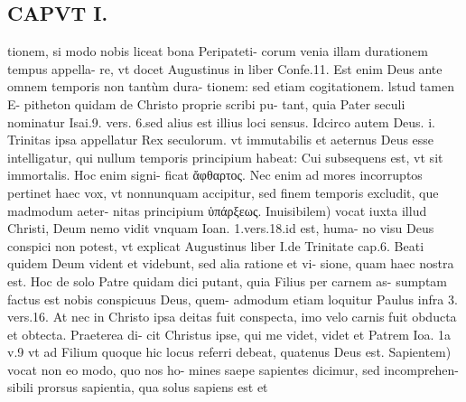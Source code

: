 \documentclass{article}
\begin{document}
\begin{pages}
\section*{CAPVT I. }
\marginpar{[ p.31 ]}\pstart tionem, si modo nobis liceat bona Peripateti- corum venia illam durationem tempus appella- re, vt docet Augustinus in liber  Confe.11. Est enim Deus ante omnem temporis non tantùm dura- tionem: sed etiam cogitationem. lstud tamen E- pitheton quidam de Christo proprie scribi pu- tant, quia Pater seculi nominatur Isai.9. vers. 6.sed alius est illius loci sensus. Idcirco autem Deus. i. Trinitas ipsa appellatur Rex seculorum. vt immutabilis et aeternus Deus esse intelligatur, qui nullum temporis principium habeat: Cui subsequens est, vt sit immortalis. Hoc enim signi- ficat ἄφθαρτος. Nec enim ad mores incorruptos pertinet haec vox, vt nonnunquam accipitur, sed finem temporis excludit, que madmodum aeter- nitas principium ὑπάρξεως.  \pend\pstart Inuisibilem) vocat iuxta illud Christi, Deum nemo vidit vnquam Ioan. 1.vers.18.id est, huma- no visu Deus conspici non potest, vt explicat Augustinus liber  I.de Trinitate cap.6. Beati quidem Deum vident et videbunt, sed alia ratione et vi- sione, quam haec nostra est. Hoc de solo Patre quidam dici putant, quia Filius per carnem as- sumptam factus est nobis conspicuus Deus, quem- admodum etiam loquitur Paulus infra 3. vers.16. At nec in Christo ipsa deitas fuit conspecta, imo velo carnis fuit obducta et obtecta. Praeterea di- cit Christus ipse, qui me videt, videt et Patrem Ioa. 1a v.9 vt ad Filium quoque hic locus referri debeat, quatenus Deus est.  \pend\pstart Sapientem) vocat non eo modo, quo nos ho- mines saepe sapientes dicimur, sed incomprehen- sibili prorsus sapientia, qua solus sapiens est et  \pend

\end{pages}
\end{document}
